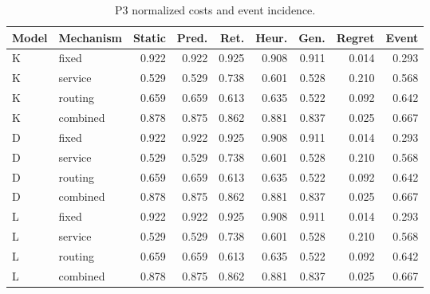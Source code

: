 \begin{table}[htbp]\caption{P3 normalized costs and event incidence.}\centering\small\setlength{\tabcolsep}{3pt}

\begin{tabular}{llrrrrrrr}\toprule

Model & Mechanism & Static & Pred. & Ret. & Heur. & Gen. & Regret & Event\\\midrule

K & fixed & 0.922 & 0.922 & 0.925 & 0.908 & 0.911 & 0.014 & 0.293\\

K & service & 0.529 & 0.529 & 0.738 & 0.601 & 0.528 & 0.210 & 0.568\\

K & routing & 0.659 & 0.659 & 0.613 & 0.635 & 0.522 & 0.092 & 0.642\\

K & combined & 0.878 & 0.875 & 0.862 & 0.881 & 0.837 & 0.025 & 0.667\\

D & fixed & 0.922 & 0.922 & 0.925 & 0.908 & 0.911 & 0.014 & 0.293\\

D & service & 0.529 & 0.529 & 0.738 & 0.601 & 0.528 & 0.210 & 0.568\\

D & routing & 0.659 & 0.659 & 0.613 & 0.635 & 0.522 & 0.092 & 0.642\\

D & combined & 0.878 & 0.875 & 0.862 & 0.881 & 0.837 & 0.025 & 0.667\\

L & fixed & 0.922 & 0.922 & 0.925 & 0.908 & 0.911 & 0.014 & 0.293\\

L & service & 0.529 & 0.529 & 0.738 & 0.601 & 0.528 & 0.210 & 0.568\\

L & routing & 0.659 & 0.659 & 0.613 & 0.635 & 0.522 & 0.092 & 0.642\\

L & combined & 0.878 & 0.875 & 0.862 & 0.881 & 0.837 & 0.025 & 0.667\\

\bottomrule\end{tabular}\end{table}

